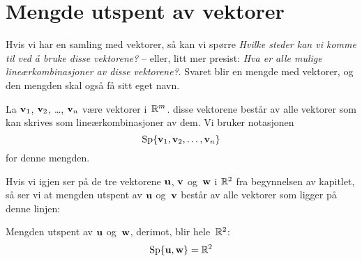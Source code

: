 

\section*{Mengde utspent av vektorer}

Hvis vi har en samling med vektorer, så kan vi spørre \emph{Hvilke
  steder kan vi komme til ved å bruke disse vektorene?} -- eller, litt
mer presist: \emph{Hva er alle mulige lineærkombinasjoner av disse
  vektorene?}.  Svaret blir en mengde med vektorer, og den mengden
skal også få sitt eget navn.

\begin{defn}
La $\mathbf{v}_1$, $\mathbf{v}_2$, \ldots, $\mathbf{v}_n$ være vektorer i~$\mathbb{R}^m$.
 disse vektorene består av
alle vektorer som kan skrives som lineærkombinasjoner av dem.
Vi bruker notasjonen
\[
\operatorname{Sp} \{ \mathbf{v}_1, \mathbf{v}_2, \ldots, \mathbf{v}_n \}
\]
for denne mengden.
\end{defn}

Hvis vi igjen ser på de tre vektorene $\mathbf{u}$, $\mathbf{v}$ og~$\mathbf{w}$ i $\mathbb{R}^2$ fra
begynnelsen av kapitlet, så ser vi at mengden utspent av $\mathbf{u}$ og~$\mathbf{v}$
består av alle vektorer som ligger på denne linjen:
\begin{center}
\end{center}
Mengden utspent av $\mathbf{u}$ og~$\mathbf{w}$, derimot, blir hele~$\mathbb{R}^2$:
\[
\operatorname{Sp} \{ \mathbf{u}, \mathbf{w} \} = \mathbb{R}^2
\]




\kapittelslutt
